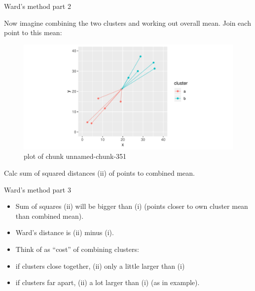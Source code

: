 \documentclass[ignorenonframetext,]{beamer}
\begin{document}
\begin{frame}{Ward's method part 2}
\protect\hypertarget{wards-method-part-2}{}

Now imagine combining the two clusters and working out overall mean.
Join each point to this mean:

\begin{figure}
\centering
\includegraphics{figure/unnamed-chunk-351-1.pdf}
\caption{plot of chunk unnamed-chunk-351}
\end{figure}

Calc sum of squared distances (ii) of points to combined mean.

\end{frame}

\begin{frame}{Ward's method part 3}
\protect\hypertarget{wards-method-part-3}{}

\begin{itemize}
\item
  Sum of squares (ii) will be bigger than (i) (points closer to own
  cluster mean than combined mean).
\item
  Ward's distance is (ii) minus (i).
\item
  Think of as ``cost'' of combining clusters:
\item
  if clusters close together, (ii) only a little larger than (i)
\item
  if clusters far apart, (ii) a lot larger than (i) (as in example).
\end{itemize}

\end{frame}
\end{document}

